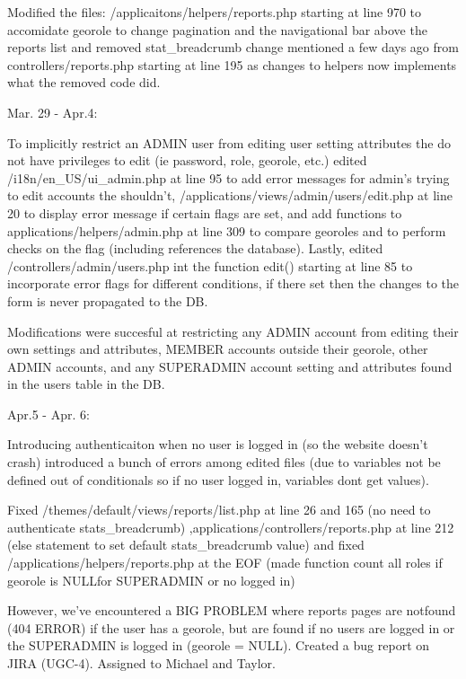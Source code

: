\documentclass{article}
\begin{document}
    Modified the files: /applicaitons/helpers/reports.php starting at line 970 to accomidate georole to change pagination 
    and the navigational bar above the reports list and removed stat_breadcrumb change mentioned a few days ago from 
    controllers/reports.php starting at line 195 as changes to helpers now implements what the removed code did.
                       
Mar. 29 - Apr.4:

    To implicitly restrict an ADMIN user from editing user setting attributes the do not have privileges to edit
    (ie password, role, georole, etc.) edited /i18n/en_US/ui_admin.php at line 95 to add error messages for admin's trying to edit
    accounts the shouldn't, /applications/views/admin/users/edit.php at line 20 to display error message if certain 
    flags are set, and add functions to applications/helpers/admin.php at line 309 to compare georoles and to
    perform checks on the flag (including references the database).  Lastly, edited /controllers/admin/users.php 
    int the function edit() starting at line 85 to incorporate error flags for different conditions, 
    if there set then the changes to the form is never propagated to the DB.
        
    Modifications were succesful at restricting any ADMIN account from editing their own settings and attributes, 
    MEMBER accounts outside their georole, other ADMIN accounts, and any SUPERADMIN account setting and attributes 
    found in the users table in the DB.
                                                                               
Apr.5 - Apr. 6:

    Introducing authenticaiton when no user is logged in (so the website doesn't crash) introduced a bunch of 
    errors among edited files (due to variables not be defined out of conditionals so if no user logged in, variables
    dont get values).
            
    Fixed /themes/default/views/reports/list.php at line 26 and 165 (no need to authenticate stats_breadcrumb)
    ,applications/controllers/reports.php at line 212 (else statement to set default stats_breadcrumb value)
    and fixed /applications/helpers/reports.php at the EOF (made function count all roles if georole is NULLfor SUPERADMIN
    or no logged in)
                
    However, we've encountered a BIG PROBLEM where reports pages are notfound (404 ERROR) if the user has a georole, but are
    found if no users are logged in or the SUPERADMIN is logged in (georole = NULL). Created a bug report on JIRA (UGC-4).
    Assigned to Michael and Taylor.
        
\end{document}

